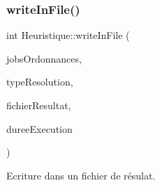 \subsubsection{\texorpdfstring{write\+In\+File()}{writeInFile()}}
{\footnotesize\ttfamily int Heuristique\+::write\+In\+File (\begin{DoxyParamCaption}\item[{vector$<$ vector$<$ int $>$$>$}]{jobs\+Ordonnances,  }\item[{Q\+String}]{type\+Resolution,  }\item[{Q\+String}]{fichier\+Resultat,  }\item[{double}]{duree\+Execution }\end{DoxyParamCaption})}



Ecriture dans un fichier de résulat. 


